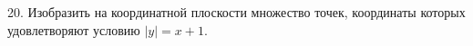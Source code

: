 20. Изобразить на координатной плоскости множество точек, координаты которых удовлетворяют условию $|y|=x+1.$\\
